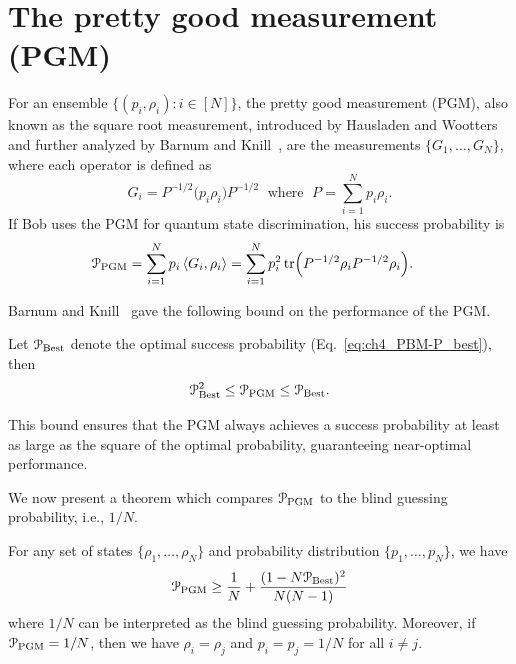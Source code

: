 \section{The pretty good measurement (PGM)} \label{sec:ch4_PBM-PGM}

For an ensemble $\{(p_i,\rho_i): i \in [N]\}$, the pretty good measurement (PGM), also known as the square root measurement, introduced by Hausladen and Wootters~\cite{hausladen1994pretty} and further analyzed by Barnum and Knill~\cite{barnum2002reversing}, are the measurements $\{G_1, \dots, G_N\}$, where each operator is defined as  
\begin{equation}
    \label{eq:ch4_PBM-PGM_ops}
    G_i = P^{-1/2} \bigg( p_i \rho_i \bigg) P^{-1/2} \; \text{ where } \; 
    P = \sum_{i=1}^N p_i \rho_i.
\end{equation} 
If Bob uses the PGM for quantum state discrimination, his success probability is
\begin{align} 
\mathcal{P}_{\mathrm{PGM}} 
& = \sum_{i=1}^N p_i \left\langle G_i, \rho_i \right\rangle = \sum_{i=1}^N p_i^2 \tr(P^{-1/2} \rho_i P^{-1/2} \rho_i). \label{eq:ch4_PBM-P_PGM} 
\end{align}

Barnum and Knill~\cite{barnum2002reversing} gave the following bound on the performance of the PGM.

\begin{theorem}
    \label{thm:ch4_PBM-barnum-knill}
    Let $\mathcal{P}_{\mathrm{Best}}$ denote the optimal success probability (Eq.~\eqref{eq:ch4_PBM-P_best}), then
    \begin{equation}
        \mathcal{P}_{\mathrm{Best}}^2 \leq \mathcal{P}_{\mathrm{PGM}} \leq \mathcal{P}_{\mathrm{Best}}.
    \end{equation}
\end{theorem} 

This bound ensures that the PGM always achieves a success probability at least as large as the square of the optimal probability, guaranteeing near-optimal performance. 

We now present a theorem which compares $\mathcal{P}_{\mathrm{PGM}}$ to the blind guessing probability, i.e., $1/N$. 

\begin{theorem}{\cite{renes2017better}} \label{thm:ch4_PBM-PGM}
For any set of states $\{ \rho_1, \ldots, \rho_N \}$ and probability distribution $\{ p_1, \ldots, p_N \}$, we have 
\begin{equation} 
\mathcal{P}_{\mathrm{PGM}} \geq \frac{1}{N} + \frac{(1 - N \mathcal{P}_{\mathrm{Best}})^2}{N (N - 1)} 
\end{equation}
where $1/N$ can be interpreted as the blind guessing probability. 
Moreover, if $\mathcal{P}_{\mathrm{PGM}} = 1/N$, then we have $\rho_i = \rho_j$ and $p_i = p_j = 1/N$ for all $i \neq j$. 
\end{theorem} 

